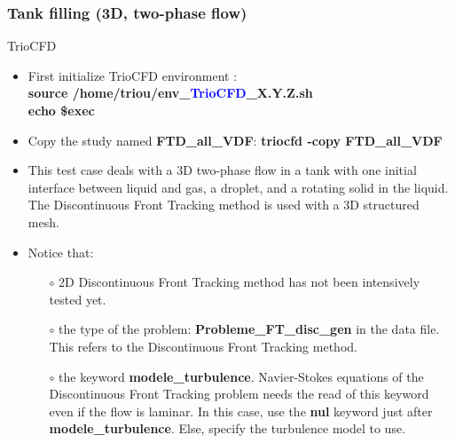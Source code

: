 \documentclass[10pt, hyperref={unicode=true,pdfusetitle, bookmarks=true,bookmarksnumbered=false,bookmarksopen=false, breaklinks=false,pdfborder={0 0 1},backref=true,colorlinks=true,linkcolor=darkblue,pageanchor}]{beamer}
\begin{document}
\begin{frame}
\frametitle{Tank filling (3D, two-phase flow)}
\begin{block}{TrioCFD}

\begin{itemize}
\item First initialize TrioCFD environment :\\
\textbf{source /home/triou/env\_\textcolor{blue}{TrioCFD}\_X.Y.Z.sh }\\
\textbf{echo \$exec} 

\item Copy the study named \textbf{FTD\_all\_VDF}: \textbf{triocfd -copy FTD\_all\_VDF}

\item This test case deals with a 3D two-phase flow in a tank with one initial interface between liquid and gas, a droplet, and a rotating solid in the liquid. The Discontinuous Front Tracking method is used with a 3D structured mesh.

\item Notice that:
    \begin{itemize}
    \item [$\circ$] 2D Discontinuous Front Tracking method has not been intensively tested yet.
    \item [$\circ$] the type of the problem: \textbf{Probleme\_FT\_disc\_gen} in the data file. This refers to the Discontinuous Front Tracking method.
    \item [$\circ$] the keyword \textbf{modele\_turbulence}. Navier-Stokes equations of the Discontinuous Front Tracking problem needs the read of this keyword even if the flow is laminar. In this case, use the \textbf{nul} keyword just after \textbf{modele\_turbulence}. Else, specify the turbulence model to use.
    \end{itemize}
\end{itemize}

\end{block}
\end{frame}
\end{document}
